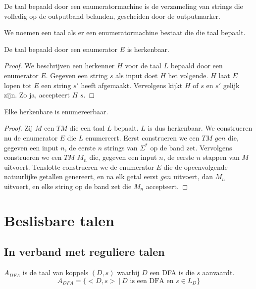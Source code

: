 \documentclass[main.tex]{subfiles}
\begin{document}
\begin{de}
  De taal bepaald door een enumeratormachine is de verzameling van strings die volledig op de outputband belanden, gescheiden door de outputmarker.
\end{de}

\begin{de}
  We noemen een taal  als er een enumeratormachine bestaat die die taal bepaalt.
\end{de}

\begin{st}
  \label{st:enumer-is-herk}
  De taal bepaald door een enumerator $E$ is herkenbaar.
  \begin{proof}
    We beschrijven een herkenner $H$ voor de taal $L$ bepaald door een enumerator $E$.
    Gegeven een string $s$ als input doet $H$ het volgende.
    $H$ laat $E$ lopen tot $E$ een string $s'$ heeft afgemaakt.
    Vervolgens kijkt $H$ of $s$ en $s'$ gelijk zijn.
    Zo ja, accepteert $H$ $s$.
  \end{proof}
\end{st}

\begin{st}
  \label{st:herk-is-enumer}
  Elke herkenbare is enumereerbaar.
  \begin{proof}
    Zij $M$ een $TM$ die een taal $L$ bepaalt.
    $L$ is dus herkenbaar.
    We construeren nu de enumerator $E$ die $L$ enumereert.
    Eerst construeren we een $TM$ $gen$ die, gegeven een input $n$, de eerste $n$ strings van $\Sigma^{*}$ op de band zet.
    Vervolgens construeren we een $TM$ $M_{n}$ die, gegeven een input $n$, de eerste $n$ stappen van $M$ uitvoert.
    Tenslotte construeren we de enumerator $E$ die de opeenvolgende natuurlijke getallen genereert, en na elk getal eerst $gen$ uitvoert, dan $M_{n}$ uitvoert, en elke string op de band zet die $M_{n}$ accepteert.
  \end{proof}
\end{st}

\section{Beslisbare talen}
\label{sec:beslisbare-talen}

\subsection{In verband met reguliere talen}
\label{sec:verb-met-regul}

\begin{de}
  \label{de:a-dfa}
  $A_{DFA}$ is de taal van koppels $(D,s)$ waarbij $D$ een DFA is die $s$ aanvaardt.
  \[ A_{DFA} = \{ <D,s> \ |\ D \text{ is een DFA en } s \in L_{D} \} \]
\end{de}
\end{document}
